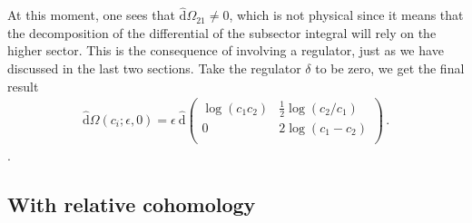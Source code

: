 \documentclass[a4paper,11pt]{article}
\newcommand{\nds}{\hat{\mathrm{d}}}
\newcommand{\ep}{\epsilon}
\begin{document}
At this moment, one sees  that $\nds \Omega_{21} \neq 0$, which is not physical since  it means that the decomposition of  the differential of the subsector integral will rely on the higher sector. This is the consequence 
of involving a regulator, just as we have discussed in the last two sections. Take the regulator $\delta$ to be zero, we get the final result
\begin{align}
\nds \Omega (c_i;\ep,0) = \ep~  \nds \left(
\begin{array}{cc}
 \log \left(c_1 c_2\right) & \frac{1}{2} \log \left(c_2/c_1\right) \\
 0 & 2  \log
   \left(c_1-c_2\right) \\
\end{array}
\right)  \, . \label{eq:1varDEreg0}
\end{align}.


\subsection{With relative cohomology}
\end{document}
